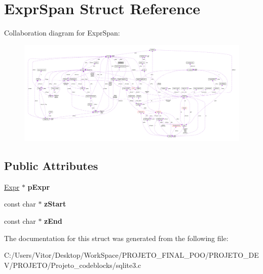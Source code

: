 \hypertarget{struct_expr_span}{\section{Expr\-Span Struct Reference}
\label{struct_expr_span}
}


Collaboration diagram for Expr\-Span\-:\nopagebreak
\begin{figure}[H]
\begin{center}
\leavevmode
\includegraphics[width=350pt]{struct_expr_span__coll__graph}
\end{center}
\end{figure}
\subsection*{Public Attributes}
\begin{DoxyCompactItemize}
\item 
\hypertarget{struct_expr_span_a081c4aa031331c8518c1173b2a8335cc}{\hyperlink{struct_expr}{Expr} $\ast$ {\bfseries p\-Expr}}\label{struct_expr_span_a081c4aa031331c8518c1173b2a8335cc}

\item 
\hypertarget{struct_expr_span_af4653638d7e67a62e7a607f682b38e25}{const char $\ast$ {\bfseries z\-Start}}\label{struct_expr_span_af4653638d7e67a62e7a607f682b38e25}

\item 
\hypertarget{struct_expr_span_a7cdf42cea729fcb5a1c477c3825ab575}{const char $\ast$ {\bfseries z\-End}}\label{struct_expr_span_a7cdf42cea729fcb5a1c477c3825ab575}

\end{DoxyCompactItemize}


The documentation for this struct was generated from the following file\-:\begin{DoxyCompactItemize}
\item 
C\-:/\-Users/\-Vitor/\-Desktop/\-Work\-Space/\-P\-R\-O\-J\-E\-T\-O\-\_\-\-F\-I\-N\-A\-L\-\_\-\-P\-O\-O/\-P\-R\-O\-J\-E\-T\-O\-\_\-\-D\-E\-V/\-P\-R\-O\-J\-E\-T\-O/\-Projeto\-\_\-codeblocks/sqlite3.\-c\end{DoxyCompactItemize}
